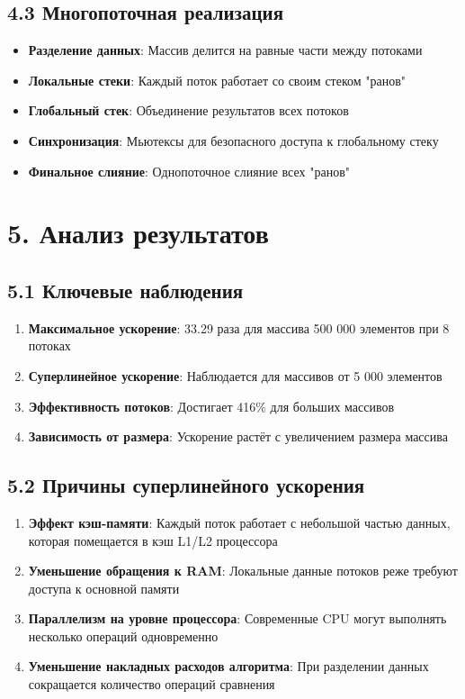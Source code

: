 \documentclass[12pt,a4paper]{article}
\begin{document}
\subsection*{4.3 Многопоточная реализация}
\begin{itemize}
    \item \textbf{Разделение данных}: Массив делится на равные части между потоками
    \item \textbf{Локальные стеки}: Каждый поток работает со своим стеком "ранов"
    \item \textbf{Глобальный стек}: Объединение результатов всех потоков
    \item \textbf{Синхронизация}: Мьютексы для безопасного доступа к глобальному стеку
    \item \textbf{Финальное слияние}: Однопоточное слияние всех "ранов"
\end{itemize}

\section*{5. Анализ результатов}

\subsection*{5.1 Ключевые наблюдения}
\begin{enumerate}
    \item \textbf{Максимальное ускорение}: 33.29 раза для массива 500 000 элементов при 8 потоках
    \item \textbf{Суперлинейное ускорение}: Наблюдается для массивов от 5 000 элементов
    \item \textbf{Эффективность потоков}: Достигает 416\% для больших массивов
    \item \textbf{Зависимость от размера}: Ускорение растёт с увеличением размера массива
\end{enumerate}

\subsection*{5.2 Причины суперлинейного ускорения}
\begin{enumerate}
    \item \textbf{Эффект кэш-памяти}: Каждый поток работает с небольшой частью данных, которая помещается в кэш L1/L2 процессора
    \item \textbf{Уменьшение обращения к RAM}: Локальные данные потоков реже требуют доступа к основной памяти
    \item \textbf{Параллелизм на уровне процессора}: Современные CPU могут выполнять несколько операций одновременно
    \item \textbf{Уменьшение накладных расходов алгоритма}: При разделении данных сокращается количество операций сравнения
\end{enumerate}
\end{document}
